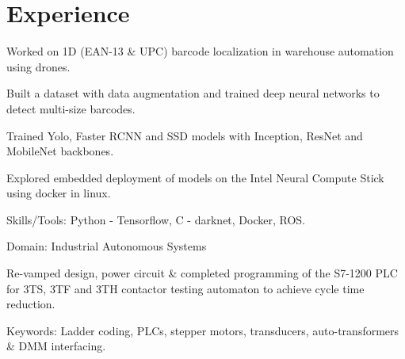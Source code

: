 \documentclass[10pt,letter,sans]{moderncv}        %
\begin{document}
    

\vspace{-2.2em}
\section{Experience}
\vspace{-1.0em}
\begin{itemize} \normalsize{
  
\item[\textbullet] Worked on 1D (EAN-13 \& UPC) barcode localization in warehouse automation using drones.
\item[\textbullet] Built a dataset with data augmentation and trained deep neural networks to detect multi-size barcodes.  
\item[\textbullet] Trained Yolo, Faster RCNN and SSD models with Inception, ResNet and MobileNet backbones.
\item[\textbullet] Explored embedded deployment of models on the Intel Neural Compute Stick using docker in linux.
\item[\textbullet] Skills/Tools: Python - Tensorflow, C - darknet, Docker, ROS.
}
\end{itemize}

\smallskip

\vspace{-1.0em}
\begin{itemize} \normalsize{
  
\item[\textbullet] Domain: Industrial Autonomous Systems
\item[\textbullet] Re-vamped design, power circuit \& completed programming of the S7-1200 PLC for 3TS, 3TF and 3TH contactor testing automaton to achieve cycle time reduction.
\item[\textbullet] Keywords: Ladder coding, PLCs, stepper motors, transducers, auto-transformers \& DMM interfacing.
}

\end{itemize}
\end{document}
